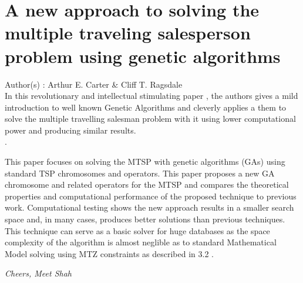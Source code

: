 \documentclass[11pt,fleqn]{book} %
\begin{document}
\section{A new approach to solving the multiple traveling salesperson problem using genetic algorithms}

Author(s) : Arthur E. Carter \& Cliff T. Ragsdale \\
        
        In this revolutionary and intellectual stimulating paper , the authors gives a mild introduction to well known Genetic Algorithms and cleverly applies a them to solve the multiple travelling salesman problem with it using lower computational power and producing similar results.\\
. 

This paper focuses on solving the MTSP with genetic algorithms (GAs) using standard TSP chromosomes and operators. This paper proposes a new GA chromosome and related operators for the MTSP and compares the theoretical properties and computational performance of the proposed technique to previous work. Computational testing shows the new approach results in a smaller search space and, in many cases, produces better solutions than previous techniques. This technique can serve as a basic solver for huge databases as the space complexity of the algorithm is almost neglible as to standard Mathematical Model solving using MTZ constraints as described in 3.2 .

\vfill
\hspace*{5cm} \textit{Cheers, Meet Shah}
\end{document}

